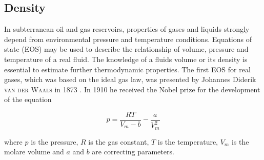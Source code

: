 


\subsection{Density} \label{eos-density}

In subterranean oil and gas reservoirs, properties of gases and liquids strongly depend from environmental pressure and temperature conditions. Equations of state (EOS) may be used to describe the relationship of volume, pressure and temperature of a real fluid. The knowledge of a fluids volume or its density is essential to estimate further thermodynamic properties. The first EOS for real gases, which was based on the ideal gas law, was presented by Johannes Diderik \textsc{van der Waals} in 1873 \cite{VanWaa:73}. In 1910 he received the Nobel prize for the development of the equation

\begin{equation}
p=\frac{RT}{V_m-b}-\frac{a}{V^2_m}
\label{eq-van-der-waals}
\end{equation}

where $p$ is the pressure, $R$ is the gas constant, $T$ is the temperature, $V_m$ is the molare volume and $a$ and $b$ are correcting parameters. 

%


